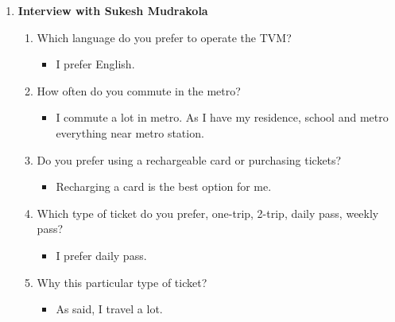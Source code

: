 \documentclass[15pt]{article}
\begin{document}
\begin{appendices}
\begin{enumerate}[leftmargin=3em, itemsep=0pt, parsep=0pt, , font=\Large\bfseries]
    
    \vspace{0.2cm}  
    \item {\Large\bfseries Interview with Sukesh Mudrakola}\\
    \begin{enumerate}[leftmargin=2em, itemsep=0pt, parsep=0pt, , font=\Large\bfseries]
        \item {\Large Which language do you prefer to operate the TVM?}
        \vspace{0.1cm}
            \begin{itemize}
                \item {\Large I prefer English.}
            \end{itemize}
            \vspace{0.2cm}
        \item {\Large How often do you commute in the metro?}
        \vspace{0.1cm}
            \begin{itemize}
                \item {\Large I commute a lot in metro. As I have my residence, school and metro everything near metro station.}
            \end{itemize}
            \vspace{0.2cm}
        \item {\Large Do you prefer using a rechargeable card or purchasing tickets?}
        \vspace{0.1cm}
            \begin{itemize}
                \item {\Large  Recharging a card is the best option for me.}
            \end{itemize}
            \vspace{0.2cm}
        \item {\Large Which type of ticket do you prefer, one-trip, 2-trip, daily pass, weekly pass?}
        \vspace{0.1cm}
            \begin{itemize}
                \item {\Large I prefer daily pass.}
            \end{itemize}
            \vspace{0.2cm}
        \item {\Large Why this particular type of ticket?}
        \vspace{0.1cm}
            \begin{itemize}
                \item {\Large As said, I travel a lot.}

\end{itemize}
\end{enumerate}
\end{enumerate}
\end{appendices}
\end{document}
